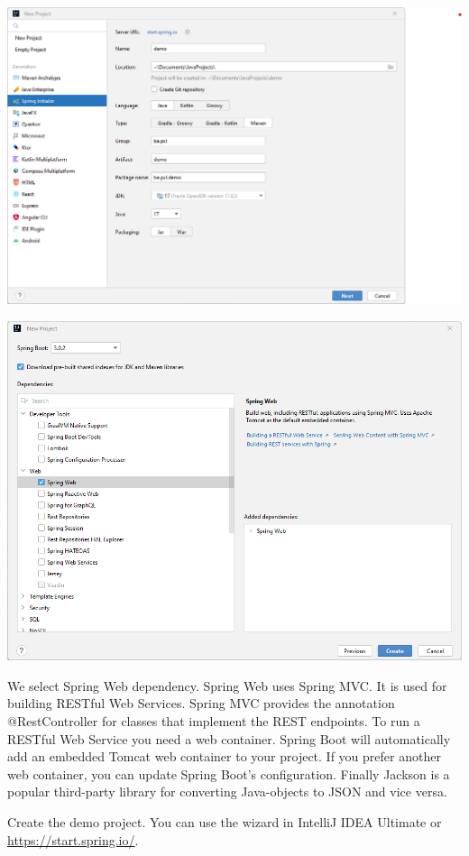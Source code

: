 \includegraphics[width=\textwidth]{./images/chapter1/spring_initializer_intellij.png}

\includegraphics[width=\textwidth]{./images/chapter1/new_project.png}

We select Spring Web dependency. Spring Web uses Spring MVC. It is used for building RESTful Web Services. Spring MVC provides the annotation @RestController for classes that implement the REST endpoints.
To run a RESTful Web Service you need a web container. Spring Boot will automatically add an embedded Tomcat web container to your project. If you prefer another web container, you can update Spring Boot's configuration.
Finally Jackson is a popular third-party library for converting Java-objects to JSON and vice versa.

\begin{oefening}
Create the demo project. You can use the wizard in IntelliJ IDEA Ultimate or \url{https://start.spring.io/}.
\end{oefening}

